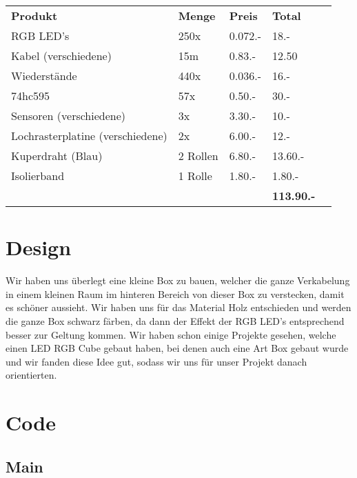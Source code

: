 \documentclass[12pt,a4paper]{article}
\begin{document}
\begin{tabularx}{\textwidth}{p{} | l | l | l | r |}
    \textbf{Produkt} & \textbf{Menge} & \textbf{Preis} & \textbf{Total} \\
    \cline{1-4}
    RGB LED's & 250x & 0.072.- & 18.- \\
    \cline{1-4}
    Kabel (verschiedene) & 15m & 0.83.- & 12.50 \\
    \cline{1-4}
    Wiederstände & 440x & 0.036.- & 16.- \\
    \cline{1-4}
    74hc595 & 57x & 0.50.- & 30.- \\   
    \cline{1-4}
    Sensoren (verschiedene) & 3x & 3.30.- & 10.- \\
    \cline{1-4}
    Lochrasterplatine (verschiedene) & 2x & 6.00.- & 12.- \\
    \cline{1-4}
    Kuperdraht (Blau) & 2 Rollen & 6.80.- & 13.60.- \\
    \cline{1-4}
    Isolierband & 1 Rolle & 1.80.- & 1.80.- \\
    \cline{1-4}
    &&&\textbf{113.90.-}
    
\end{tabularx}

\section{Design}

Wir haben uns überlegt eine kleine Box zu bauen, welcher die ganze Verkabelung in einem
kleinen Raum im hinteren Bereich von dieser Box zu verstecken, damit es schöner aussieht.
Wir haben uns für das Material Holz entschieden und werden die ganze Box schwarz färben,
da dann der Effekt der RGB LED's entsprechend besser zur Geltung kommen.
Wir haben schon einige Projekte gesehen, welche einen LED RGB Cube gebaut haben, bei denen auch eine 
Art Box gebaut wurde und wir fanden diese Idee gut, sodass wir uns für unser Projekt danach orientierten.


\section{Code}

\subsection{Main}
\end{document}
